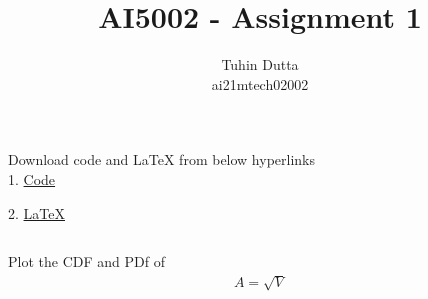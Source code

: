 \documentclass[journal,12pt,twocolumn]{IEEEtran}
\begin{document}
\providecommand{\mtx}[1]{\mathbf{#1}}
\providecommand{\fourier}{\overset{\mathcal{F}}{ \rightleftharpoons}}
\providecommand{\system}{\overset{\mathcal{H}}{ \longleftrightarrow}}
\newcommand{\solution}{\noindent \textbf{Solution: }}
\newcommand{\cosec}{\,\text{cosec}\,}
\providecommand{\dec}[2]{\ensuremath{\overset{#1}{\underset{#2}{\gtrless}}}}
\newcommand{\myvec}[1]{\ensuremath{\begin{pmatrix}#1\end{pmatrix}}}
\newcommand{\mydet}[1]{\ensuremath{\begin{vmatrix}#1\end{vmatrix}}}
\makeatletter
{}
\makeatother
\let\StandardTheFigure\thefigure
\let\vec\mathbf
\renewcommand{\thefigure}{\theproblem}
\def\putbox#1#2#3{\makebox[0in][l]{\makebox[#1][l]{}\raisebox{\baselineskip}[0in][0in]{\raisebox{#2}[0in][0in]{#3}}}}
     \def\rightbox#1{\makebox[0in][r]{#1}}
     \def\centbox#1{\makebox[0in]{#1}}
     \def\topbox#1{\raisebox{-\baselineskip}[0in][0in]{#1}}
     \def\midbox#1{\raisebox{-0.5\baselineskip}[0in][0in]{#1}}
\vspace{3cm}
\title{AI5002 - Assignment 1}
\author{Tuhin Dutta\\ ai21mtech02002}
\maketitle
\newpage
\bigskip
\renewcommand{\thefigure}{\theenumi}
\renewcommand{\thetable}{\theenumi}
\begin{mdframed}
Download code and LaTeX from below hyperlinks\\
1. \href{https://github.com/Tauhait/AI5002/tree/main/Assignment-1/Codes}{Code}


2. \href{https://github.com/Tauhait/AI5002/tree/main/Assignment-1/LaTeX}{LaTeX}
\end{mdframed}
\subsection*{}

Plot the CDF and PDf of\\
\begin{align}
A = \sqrt{V}
\end{align}
\end{document}
